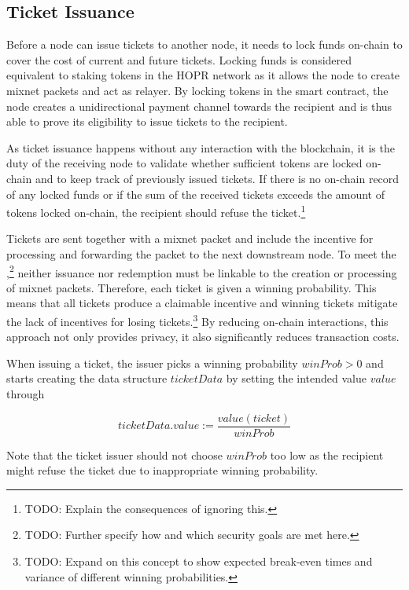 \subsection{Ticket Issuance}
\label{sec:tickets:issuance}

Before a node can issue tickets to another node, it needs to lock funds on-chain to cover the cost of current and future tickets. Locking funds is considered equivalent to staking tokens in the HOPR network as it allows the node to create mixnet packets and act as relayer. By locking tokens in the smart contract, the node creates a unidirectional payment channel towards the recipient and is thus able to prove its eligibility to issue tickets to the recipient.

As ticket issuance happens without any interaction with the blockchain, it is the duty of the receiving node to validate whether sufficient tokens are locked on-chain and to keep track of previously issued tickets. If there is no on-chain record of any locked funds or if the sum of the received tickets exceeds the amount of tokens locked on-chain, the recipient should refuse the ticket.\footnote{TODO: Explain the consequences of ignoring this.}

Tickets are sent together with a mixnet packet and include the incentive for processing and forwarding the packet to the next downstream node. To meet the ,\footnote{TODO: Further specify how and which security goals are met here.} neither issuance nor redemption must be linkable to the creation or processing of mixnet packets. Therefore, each ticket is given a winning probability. This means that all tickets produce a claimable incentive and winning tickets mitigate the lack of incentives for losing tickets.\footnote{TODO: Expand on this concept to show expected break-even times and variance of different winning probabilities.} By reducing on-chain interactions, this approach not only provides privacy, it also significantly reduces transaction costs.

When issuing a ticket, the issuer picks a winning probability $winProb > 0$ and starts creating the data structure $ticketData$ by setting the intended value $value$ through

$$ ticketData.value := \frac{value(ticket)}{winProb} $$

Note that the ticket issuer should not choose $winProb$ too low as the recipient might refuse the ticket due to inappropriate winning probability.

